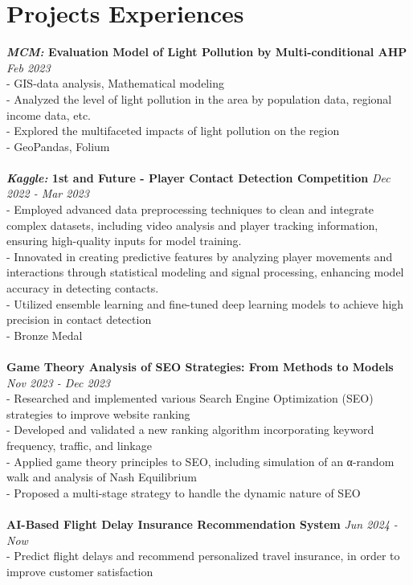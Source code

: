 \documentclass[a4paper,10pt]{article}
\begin{document}
\section*{Projects Experiences}
\textbf{\textit{MCM:} Evaluation Model of Light Pollution by Multi-conditional AHP} \hfill \textit{Feb 2023}\\
- GIS-data analysis, Mathematical modeling\\
- Analyzed the level of light pollution in the area by population data, regional income data, etc.\\
- Explored the multifaceted impacts of light pollution on the region\\
- GeoPandas, Folium\\
\\
\textbf{\textit{Kaggle:} 1st and Future - Player Contact Detection Competition} \hfill \textit{Dec 2022 - Mar 2023}\\
- Employed advanced data preprocessing techniques to clean and integrate complex datasets, including video analysis and player tracking information, ensuring high-quality inputs for model training.\\
- Innovated in creating predictive features by analyzing player movements and interactions through statistical modeling and signal processing, enhancing model accuracy in detecting contacts.\\
- Utilized ensemble learning and fine-tuned deep learning models to achieve high precision in contact detection\\
- Bronze Medal\\
\\
\textbf{Game Theory Analysis of SEO Strategies: From Methods to Models} \hfill \textit{Nov 2023 - Dec 2023}\\
- Researched and implemented various Search Engine Optimization (SEO) strategies to improve website ranking\\
- Developed and validated a new ranking algorithm incorporating keyword frequency, traffic, and linkage\\
- Applied game theory principles to SEO, including simulation of an α-random walk and analysis of Nash Equilibrium\\
- Proposed a multi-stage strategy to handle the dynamic nature of SEO\\
\\
\textbf{AI-Based Flight Delay  Insurance Recommendation System} \hfill \textit{Jun 2024 - Now}\\
- Predict flight delays and recommend personalized travel insurance, in order to improve customer satisfaction\\
\end{document}
